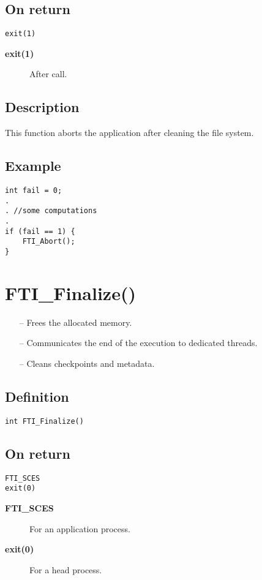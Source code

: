 \documentclass{refrep}
\begin{document}
\subsection*{On return}
\begin{lstlisting}[frame=single]
exit(1)
\end{lstlisting}
\begin{description}
\item[\textbf{exit(1)}] After call.
\end{description}
\subsection*{Description}
This function aborts the application after cleaning the file system.
\subsection*{Example}
\begin{center}
\begin{lstlisting}[frame=single]
int fail = 0;
.
. //some computations
.
if (fail == 1) {
    FTI_Abort();
}
\end{lstlisting}
\end{center}
\newpage
\section{\asciifamily FTI\_Finalize()}\label{sec:ftifinalize}
\begin{framed}
\begin{itemize}
\item[--] Frees the allocated memory.
\item[--] Communicates the end of the execution to dedicated threads.
\item[--] Cleans checkpoints and metadata.
\end{itemize}
\end{framed}
\subsection*{Definition}
\begin{lstlisting}[frame=single]
int FTI_Finalize()
\end{lstlisting}
\subsection*{On return}
\begin{lstlisting}[frame=single]
FTI_SCES
exit(0)
\end{lstlisting}
\begin{description}
\item[\textbf{FTI\_SCES}] For an application process.
\item[\textbf{exit(0)}] For a head process.
\end{description}
\end{document}
